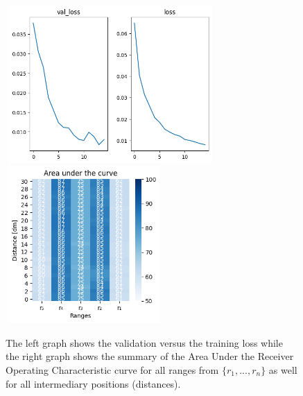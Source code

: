 \begin{multicols}{2}
\end{multicols}\begin{figure}[H]%
\centering
\includegraphics[width=8cm,height=6cm]{3_models/models_8/graph_8.png}
\hspace{0.2 cm}
\includegraphics[width=6cm,height=6cm]{4_plots/plots_8/AUC_8.png}
\caption{The left graph shows the validation versus the training loss while the right graph shows the summary of the Area Under the Receiver Operating Characteristic curve for all ranges from $\{r_{1}, ... ,r_{n}\}$ as well for all intermediary positions (distances).}
\label{auc_8}
\end{figure}

\newpage

